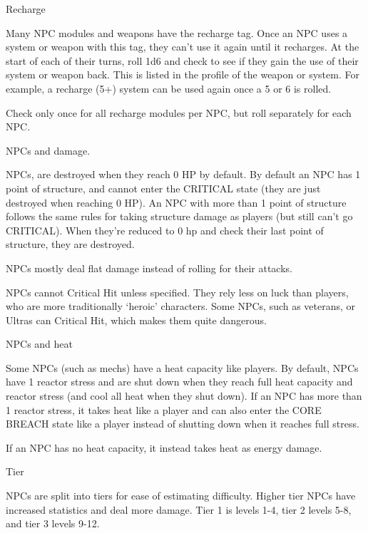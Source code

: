                                                    Recharge  

Many NPC modules and weapons have the recharge tag. Once an NPC uses a system or  
weapon with this tag, they can’t use it again until it recharges. At the start of each of their turns,  
roll 1d6 and check to see if they gain the use of their system or weapon back. This is listed in the  
profile of the weapon or system. For example, a recharge (5+) system can be used again once a  
5 or 6 is rolled.
 

Check only once for all recharge modules per NPC, but roll separately for each NPC.
 

                                             NPCs and damage.
 

NPCs, are destroyed when they reach 0 HP by default. By default an NPC has 1 point of  
structure, and cannot enter the CRITICAL state (they are just destroyed when reaching 0 HP). An  
NPC with more than 1 point of structure follows the same rules for taking structure damage as  
players (but still can’t go CRITICAL). When they’re reduced to 0 hp and check their last point of  
structure, they are destroyed.
 

NPCs mostly deal flat damage instead of rolling for their attacks.
 

                                                                                                              


NPCs cannot Critical Hit unless specified. They rely less on luck than players, who are more  
traditionally ‘heroic’ characters. Some NPCs, such as veterans, or Ultras can Critical Hit, which  
makes them quite dangerous.
 

                                                 NPCs and heat  

Some NPCs (such as mechs) have a heat capacity like players. By default, NPCs have 1 reactor  
stress and are shut down when they reach full heat capacity and reactor stress (and cool all heat  
when they shut down). If an NPC has more than 1 reactor stress, it takes heat like a player and  
can also enter the CORE BREACH state like a player instead of shutting down when it reaches  
full stress.
 
If an NPC has no heat capacity, it instead takes heat as energy damage.
 

                                                        Tier  

NPCs are split into tiers for ease of estimating difficulty. Higher tier NPCs have increased  
statistics and deal more damage. Tier 1 is levels 1-4, tier 2 levels 5-8, and tier 3 levels 9-12.
 

